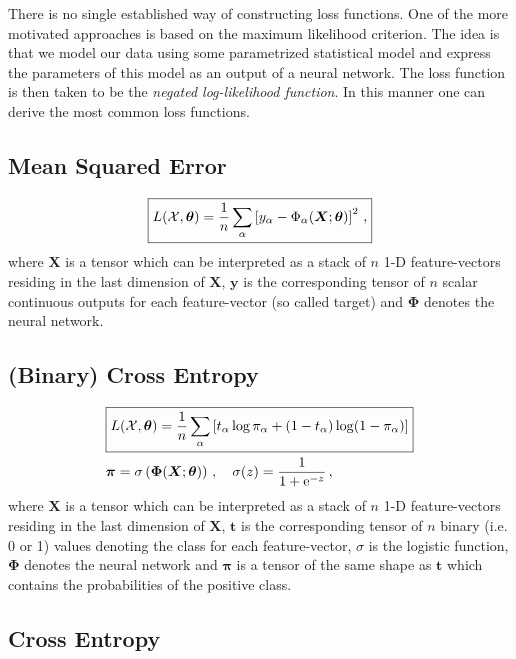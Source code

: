 \documentclass{myclass}
\begin{document}
\medskip

There is no single established way of constructing loss functions. One of the more motivated approaches is based on the maximum likelihood criterion. The idea is that we model our data using some parametrized statistical model and express the parameters of this model as an output of a neural network. The loss function is then taken to be the \emph{negated log-likelihood function}. In this manner one can derive the most common loss functions.

\subsection{Mean Squared Error}

\[\boxed{
   L(\mathcal{X}, \bm{\theta}) = \frac{1}{n} \sum_\alpha \left[ y_\alpha - \Phi_\alpha(\bm{X};\bm{\theta}) \right]^2 \,,
}\]
where \(\bm{X}\) is a tensor which can be interpreted as a stack of \(n\) 1-D feature-vectors residing in the last dimension of \(\bm{X}\), \(\bm{y}\) is the corresponding tensor of \(n\) scalar continuous outputs for each feature-vector (so called target) and \(\bm{\Phi}\) denotes the neural network.

\subsection{(Binary) Cross Entropy}

\[\begin{split}
   &\boxed{L(\mathcal{X}, \bm{\theta}) = \frac{1}{n} \sum_{\alpha} \left[ t_\alpha \log \pi_\alpha + (1-t_\alpha)\log(1-\pi_\alpha) \right]} \\
   & \bm{\pi} = \sigma\left( \bm{\Phi}(\bm{X}; \bm{\theta})\right)\,,\quad \sigma(z) = \frac{1}{1 + \mathrm{e}^{-z}}\,,
\end{split}
\]
where \(\bm{X}\) is a tensor which can be interpreted as a stack of \(n\) 1-D feature-vectors residing in the last dimension of \(\bm{X}\), \(\bm{t}\) is the corresponding tensor of \(n\) binary (i.e. 0 or 1) values denoting the class for each feature-vector, \(\sigma\) is the logistic function, \(\bm{\Phi}\) denotes the neural network and \(\bm{\pi}\) is a tensor of the same shape as \(\bm{t}\) which contains the probabilities of the positive class.

\subsection{Cross Entropy}
\end{document}
